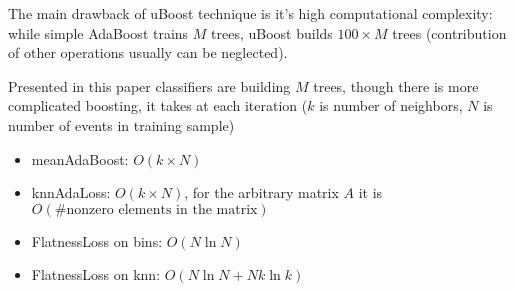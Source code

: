 The main drawback of uBoost technique is it's high computational complexity: 
while simple AdaBoost trains $M$ trees, uBoost builds $100 \times M$ trees (contribution of other operations usually can be neglected). 

Presented in this paper classifiers are building $M$ trees, though there is more complicated boosting, it takes at each iteration ($k$ is number of neighbors, $N$ is number of events in training sample)

\begin{itemize}
	\item meanAdaBoost: $O(k \times N)$
	\item knnAdaLoss: $O(k \times N)$, for the arbitrary matrix $A$ it is 
	$O( \text{\#nonzero elements in the matrix})$
	\item FlatnessLoss on bins: $O(N \ln N)$
	\item FlatnessLoss on knn: $O(N \ln N + N k \ln k) $ 
\end{itemize}

